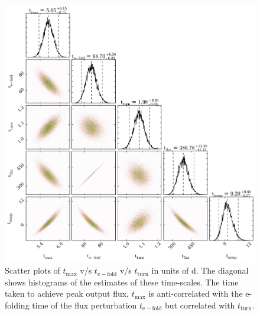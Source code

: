 \documentclass[a4paper,fleqn,usenatbib]{mnras}
\begin{document}
\begin{figure}
    \includegraphics[width=\textwidth]{images/Zw229-15_Times.jpg}
    \caption{Scatter plots of $t_{\mathrm{max}}$ v/s $t_{\mathrm{e-fold}}$ v/s $t_{\mathrm{turn}}$ in units of d. The diagonal shows histograms of the estimates of these time-scales. The time taken to achieve peak output flux, $t_{\mathrm{max}}$ is anti-correlated with the e-folding time of the flux perturbation $t_{\mathrm{e-fold}}$ but correlated with $t_{\mathrm{turn}}$.}  
    \label{fig:Zw229-15_times}
\end{figure}
\end{document}
